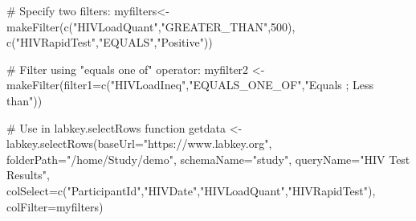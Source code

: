 \documentclass{article}
\begin{document}
\begin{SeeAlso}\relax
{}
\end{SeeAlso}
\begin{Examples}
\begin{ExampleCode}

# Specify two filters:
myfilters<- makeFilter(c("HIVLoadQuant","GREATER_THAN",500), c("HIVRapidTest","EQUALS","Positive"))

# Filter using "equals one of" operator:
myfilter2 <- makeFilter(filter1=c("HIVLoadIneq","EQUALS_ONE_OF","Equals ; Less than"))

# Use in labkey.selectRows function
getdata <- labkey.selectRows(baseUrl="https://www.labkey.org", folderPath="/home/Study/demo", 
schemaName="study", queryName="HIV Test Results", 
colSelect=c("ParticipantId","HIVDate","HIVLoadQuant","HIVRapidTest"), colFilter=myfilters)


\end{ExampleCode}
\end{Examples}
\end{document}
